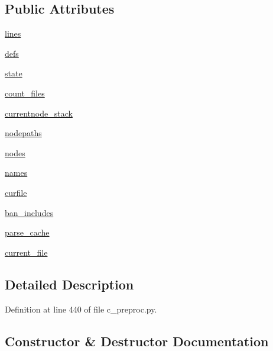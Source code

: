 \subsection*{Public Attributes}
\begin{DoxyCompactItemize}
\item 
\hyperlink{classwaflib_1_1_tools_1_1c__preproc_1_1c__parser_ac0b6a33d116646239eb666df4a2df2c7}{lines}
\item 
\hyperlink{classwaflib_1_1_tools_1_1c__preproc_1_1c__parser_ad0661c2c075facc321f3c51d1c570c08}{defs}
\item 
\hyperlink{classwaflib_1_1_tools_1_1c__preproc_1_1c__parser_a1b75df8aefa5de8afe76ed1eadda9bc3}{state}
\item 
\hyperlink{classwaflib_1_1_tools_1_1c__preproc_1_1c__parser_af84f8750efedc8bc34ade1af8755640e}{count\+\_\+files}
\item 
\hyperlink{classwaflib_1_1_tools_1_1c__preproc_1_1c__parser_aeeef004b9f676b1aa95008bc6a467e91}{currentnode\+\_\+stack}
\item 
\hyperlink{classwaflib_1_1_tools_1_1c__preproc_1_1c__parser_a175b9d997a489166cdfbff084ded4adf}{nodepaths}
\item 
\hyperlink{classwaflib_1_1_tools_1_1c__preproc_1_1c__parser_a09169a43f2421bb19c2d2e57a80d0bf4}{nodes}
\item 
\hyperlink{classwaflib_1_1_tools_1_1c__preproc_1_1c__parser_a86b51ec1e529d45579dd19158fb32d83}{names}
\item 
\hyperlink{classwaflib_1_1_tools_1_1c__preproc_1_1c__parser_aa314d9c7a0ef9ab160fbfb13bf391143}{curfile}
\item 
\hyperlink{classwaflib_1_1_tools_1_1c__preproc_1_1c__parser_a39b00dafe2511a87294925a7b289940c}{ban\+\_\+includes}
\item 
\hyperlink{classwaflib_1_1_tools_1_1c__preproc_1_1c__parser_a28b1dbbf9b3188c9c75cefc68446067c}{parse\+\_\+cache}
\item 
\hyperlink{classwaflib_1_1_tools_1_1c__preproc_1_1c__parser_aabab8961df62f9823fe7fd5409753bf0}{current\+\_\+file}
\end{DoxyCompactItemize}


\subsection{Detailed Description}


Definition at line 440 of file c\+\_\+preproc.\+py.



\subsection{Constructor \& Destructor Documentation}
